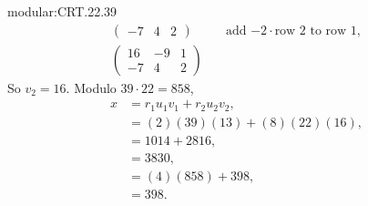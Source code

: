 \begin{answer}{modular:CRT.22.39}
\begin{align*}
\begin{pmatrix}
-7&4&2
\end{pmatrix}
&\quad\text{add \(-2\cdot\)row 2 to row 1},\\
\begin{pmatrix}
16&-9&1\\
-7&4&2
\end{pmatrix}
\end{align*}
So \(v_2=16\).
Modulo \(39\cdot 22=858\), 
\begin{align*}
x&=r_1u_1v_1+r_2u_2v_2,\\
 &=(2)(39)(13)+(8)(22)(16),\\
 &=1014+2816,\\
 &=3830,\\
 &=(4)(858)+398,\\
 &=398.
\end{align*}
\end{answer}
